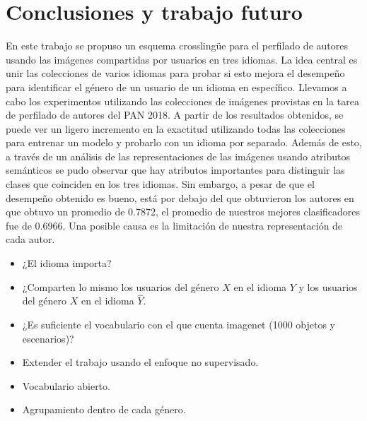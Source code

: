 \documentclass[runningheads]{llncs}
\begin{document}
\section{Conclusiones y trabajo futuro}
En este trabajo se propuso un esquema crosslingüe para el perfilado de autores
usando las imágenes compartidas por usuarios en tres idiomas. La idea central
es unir las colecciones de varios idiomas para probar si esto mejora el 
desempeño para identificar el género de un usuario de un idioma en específico.
Llevamos a cabo los experimentos utilizando las colecciones de imágenes
provistas en la tarea de perfilado de autores
del PAN 2018. A partir de los resultados obtenidos, se puede ver un 
ligero incremento en la exactitud utilizando todas las colecciones para
entrenar un modelo y probarlo con un idioma por separado.
Además de esto, a través de un análisis de las representaciones
de las imágenes usando atributos semánticos se pudo observar que hay 
atributos importantes para distinguir las clases que coinciden en 
los tres idiomas. Sin embargo, a pesar de que el desempeño obtenido es bueno,
está por debajo del que obtuvieron los autores en \cite{takahashi_tahara_nagatan_miura_taniguchi_ohkuma} que obtuvo
un promedio de 0.7872, el promedio de nuestros mejores clasificadores fue 
de 0.6966. Una posible causa es la limitación de nuestra representación
de cada autor.
\begin{itemize}
    \item ¿El idioma importa? 
    \item ¿Comparten lo mismo los usuarios del género $X$ en el idioma
    $Y$ y los usuarios del género $X$ en el idioma $\hat{Y}$.
    \item ¿Es suficiente el vocabulario con el que cuenta imagenet
    (1000 objetos y escenarios)?
    \item Extender el trabajo usando el enfoque no supervisado.
    \item Vocabulario abierto.
    \item Agrupamiento dentro de cada género.
\end{itemize}



\end{document}
